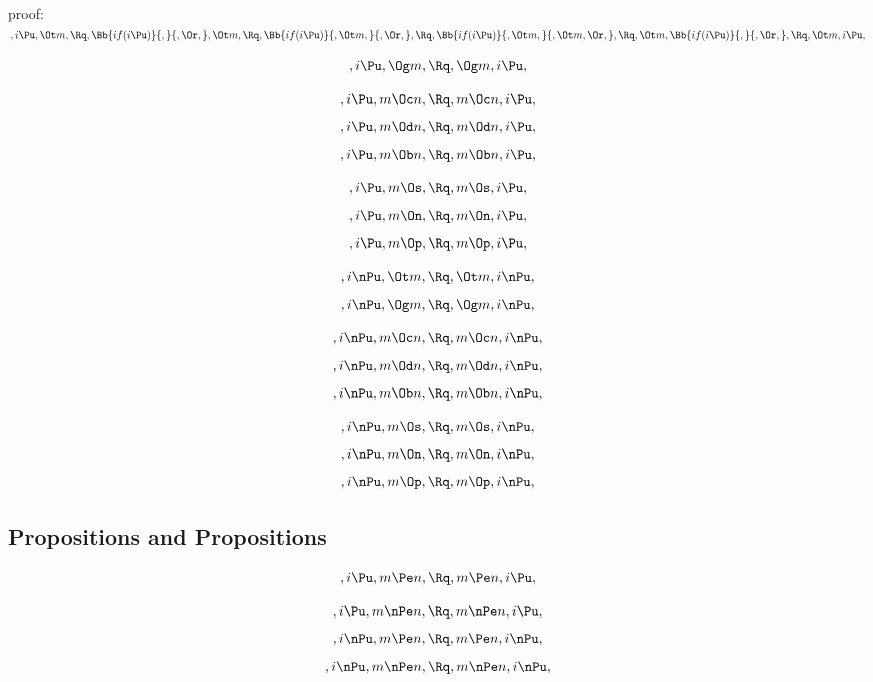 \bigskip
\bigskip
\bigskip
\bigskip
proof:\\
\begin{math} 
, i \Pu, \Ot m,\\\\\\
\Rq, \Bb{if(i \Pu)}{,}{,\Or,}, \Ot m,\\\\\\
\Rq, \Bb{if(i \Pu)}{, \Ot m,}{,\Or,},\\\\\\
\Rq, \Bb{if(i \Pu)}{, \Ot m,}{, \Ot m,\Or,},\\\\\\
\Rq, \Ot m, \Bb{if(i \Pu)}{,}{,\Or,},\\\\\\
\Rq, \Ot m, i \Pu,
\end{math}



\[, i \Pu, \Og m, \Rq , \Og m, i \Pu,\]

\[, i \Pu, m \Oc n, \Rq , m \Oc n, i \Pu,\]
\[, i \Pu, m \Od n, \Rq , m \Od n, i \Pu,\]
\[, i \Pu, m \Ob n, \Rq , m \Ob n, i \Pu,\]

\[, i \Pu, m \Os, \Rq , m \Os, i \Pu,\]
\[, i \Pu, m \On, \Rq , m \On, i \Pu,\]
\[, i \Pu, m \Op, \Rq , m \Op, i \Pu,\]

\bigskip
\bigskip
\[, i \nPu, \Ot m, \Rq , \Ot m, i \nPu,\]
\[, i \nPu, \Og m, \Rq , \Og m, i \nPu,\]

\[, i \nPu, m \Oc n, \Rq , m \Oc n, i \nPu,\]
\[, i \nPu, m \Od n, \Rq , m \Od n, i \nPu,\]
\[, i \nPu, m \Ob n, \Rq , m \Ob n, i \nPu,\]

\[, i \nPu, m \Os, \Rq , m \Os, i \nPu,\]
\[, i \nPu, m \On, \Rq , m \On, i \nPu,\]
\[, i \nPu, m \Op, \Rq , m \Op, i \nPu,\]



\bigskip
\bigskip
\bigskip
\bigskip
\subsection{ Propositions and Propositions}
\[,i \Pu, m \Pe n, \Rq , m \Pe n, i \Pu,\]



\[,i \Pu, m \nPe n, \Rq , m \nPe n, i \Pu,\]
\[,i \nPu, m \Pe n, \Rq , m \Pe n, i \nPu,\]
\[,i \nPu, m \nPe n, \Rq , m \nPe n, i \nPu,\]

